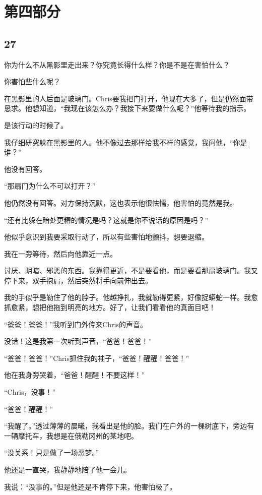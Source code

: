 \documentclass[UTF8]{article}
\begin{document}
\section*{第四部分}
\subsection*{27}
\par 你为什么不从黑影里走出来？你究竟长得什么样？你是不是在害怕什么？
\par 你害怕些什么呢？
\par 在黑影里的人后面是玻璃门。Chris要我把门打开，他现在大多了，但是仍然面带恳求。他想知道，“我现在该怎么办？我接下来要做什么呢？”他等待我的指示。
\par 是该行动的时候了。
\par 我仔细研究躲在黑影里的人。他不像过去那样给我不祥的感觉，我问他，“你是谁？”
\par 他没有回答。
\par “那扇门为什么不可以打开？”
\par 他仍然没有回答。对方保持沉默，这也表示他很怯懦，他害怕的竟然是我。
\par “还有比躲在暗处更糟的情况是吗？这就是你不说话的原因是吗？”
\par 他似乎意识到我要采取行动了，所以有些害怕地颤抖，想要退缩。
\par 我在一旁等待，然后向他靠近一点。
\par 讨厌、阴暗、邪恶的东西。我靠得更近，不是要看他，而是要看那扇玻璃门。我又停下来，双手抱肩，然后突然将手向前伸出去。
\par 我的手似乎是勒住了他的脖子。他越挣扎，我就勒得更紧，好像捉蟒蛇一样。我愈抓愈紧，想把他拖到明亮的地方。好了，让我们看看他的真面目吧！
\par “爸爸！爸爸！”我听到门外传来Chris的声音。
\par 没错！这是我第一次听到声音，“爸爸！爸爸！”
\par “爸爸！爸爸！”Chris抓住我的袖子，“爸爸！醒醒！爸爸！”
\par 他在我身旁哭着，“爸爸！醒醒！不要这样！”
\par “Chris，没事！”
\par “爸爸！醒醒！”
\par “我醒了。”透过薄薄的晨曦，我看出是他的脸。我们在户外的一棵树底下，旁边有一辆摩托车，我想是在俄勒冈州的某地吧。
\par “没关系！只是做了一场恶梦。”
\par 他还是一直哭，我静静地陪了他一会儿。
\par 我说：“没事的。”但是他还是不肯停下来，他害怕极了。
\end{document}
